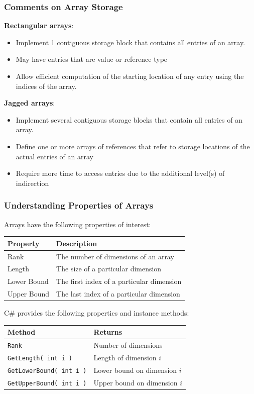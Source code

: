 \begin{frame}
\frametitle{Comments on Array Storage}
\textbf{Rectangular arrays}:

\begin{itemize}
	\item Implement 1 contiguous storage block that contains all entries of an array.
	\item May have entries that are value or reference type
	\item Allow efficient computation of the starting location of any entry using the indices of the array.
\end{itemize}

\textbf{Jagged arrays}:
\begin{itemize}
	\item  Implement several contiguous storage blocks that contain all entries of an array.
	\item Define one or more arrays of references that refer to storage locations of the actual entries of an array
	\item Require more time to access entries due to the additional level(s) of indirection
\end{itemize}

\end{frame}

\begin{frame}
\frametitle{Understanding Properties of Arrays}

Arrays have the following properties of interest:
\begin{center}
\begin{tabular}{l|l}
	\textbf{Property} & \textbf{Description}\\ \hline
	Rank & The number of dimensions of an array\\ \hline
	Length & The size of a particular dimension\\ \hline
	Lower Bound & The first index of a particular dimension\\ \hline
	Upper Bound & The last index of a particular dimension\\
\end{tabular}
\end{center}

C\# provides the following properties and instance methods:
\begin{center}
\begin{tabular}{l|l}
	\textbf{Method} & \textbf{Returns} \\ \hline
	\texttt{Rank} & Number of dimensions \\ \hline
	\texttt{GetLength( int i )} & Length of dimension $i$ \\ \hline
	\texttt{GetLowerBound( int i )} & Lower bound on dimension $i$ \\ \hline
	\texttt{GetUpperBound( int i )} & Upper bound on dimension $i$
\end{tabular}
\end{center}
\end{frame}


